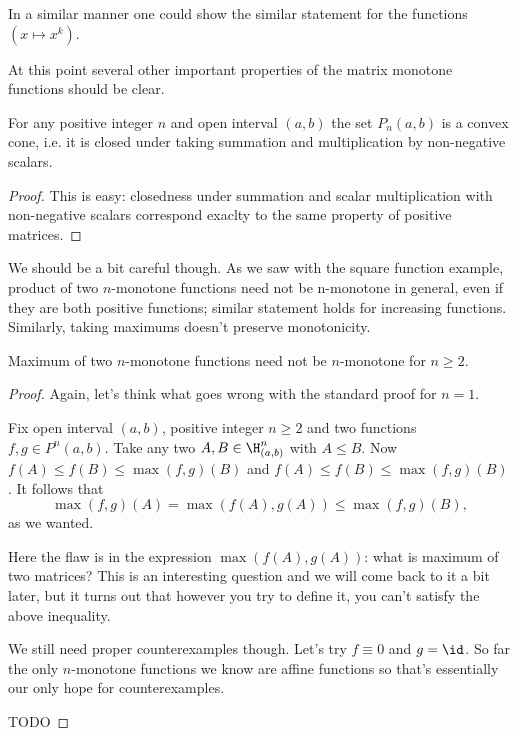 In a similar manner one could show the similar statement for the functions $(x \mapsto x^k)$.

At this point several other important properties of the matrix monotone functions should be clear.

\begin{prop}
	For any positive integer $n$ and open interval $(a, b)$ the set $P_{n}(a, b)$ is a convex cone, i.e. it is closed under taking summation and multiplication by non-negative scalars.
\end{prop}

\begin{proof}
	This is easy: closedness under summation and scalar multiplication with non-negative scalars correspond exaclty to the same property of positive matrices.
\end{proof}

We should be a bit careful though. As we saw with the square function example, product of two $n$-monotone functions need not be n-monotone in general, even if they are both positive functions; similar statement holds for increasing functions. Similarly, taking maximums doesn't preserve monotonicity.

\begin{prop}
	Maximum of two $n$-monotone functions need not be $n$-monotone for $n \geq 2$.
\end{prop}
\begin{proof}
	Again, let's think what goes wrong with the standard proof for $n = 1$.

	Fix open interval $(a, b)$, positive integer $n \geq 2$ and two functions $f, g \in P^{n}(a, b)$. Take any two $A, B \in \H_{(a, b)}^{n}$ with $A \leq B$. Now $f(A) \leq f(B) \leq \max(f, g)(B)$ and $f(A) \leq f(B) \leq \max(f, g)(B)$. It follows that
	\[
		\max(f, g)(A) = \max(f(A), g(A)) \leq \max(f, g)(B),
	\]
	as we wanted.

	Here the flaw is in the expression $\max(f(A), g(A))$: what is maximum of two matrices? This is an interesting question and we will come back to it a bit later, but it turns out that however you try to define it, you can't satisfy the above inequality.

	We still need proper counterexamples though. Let's try $f \equiv 0$ and $g = \id$. So far the only $n$-monotone functions we know are affine functions so that's essentially our only hope for counterexamples.

	TODO
\end{proof}

